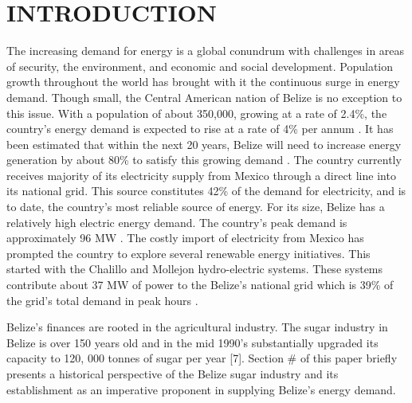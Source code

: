 \documentclass[twocolumn,10pt]{asme2e}
\begin{document}


\section*{INTRODUCTION}

The increasing demand for energy is a global conundrum with challenges in areas of security, the environment, and economic and social development.\cite{asmemanual} Population growth throughout the world has brought with it the continuous surge in energy demand. Though small, the Central American nation of Belize is no exception to this issue. With a population of about 350,000, growing at a rate of 2.4\%, the country's energy demand is expected to rise at a rate of 4\% per annum \cite{sib_pop}. It has been estimated that within the next 20 years, Belize will need to increase energy generation by about 80\% to satisfy this growing demand \cite{idb_energy}. The country currently receives majority of its electricity supply from Mexico through a direct line into its national grid. This source constitutes 42\% of the demand for electricity, and is to date, the country's most reliable source of energy. For its size, Belize has a relatively high electric energy demand. The country's peak demand is approximately 96 MW \cite{bel_report}. The costly import of electricity from Mexico has prompted the country to explore several renewable energy initiatives. This started with the Chalillo and Mollejon hydro-electric systems. These systems contribute about 37 MW of power to the Belize's national grid which is 39\% of the grid's total demand in peak hours \cite{bel_eng_policy}.

Belize's finances are rooted in the agricultural industry. The sugar industry in Belize is over 150 years old and in the mid 1990's substantially upgraded its capacity to 120, 000 tonnes of sugar per year [7]. Section \# of this paper briefly presents a historical perspective of the Belize sugar industry and its establishment as an imperative proponent in supplying Belize's energy demand. 
\end{document}
